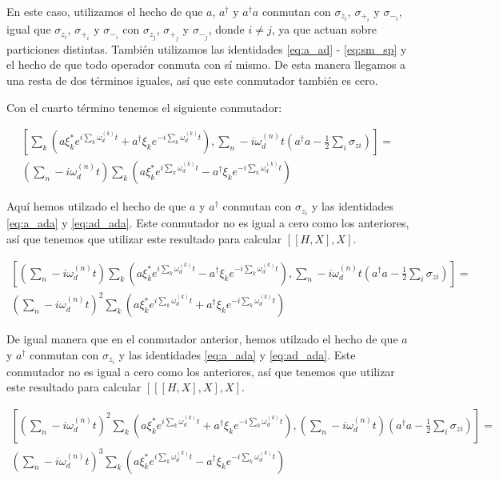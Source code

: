 En este caso, utilizamos el hecho de que $a$, $a^\dagger$ y $a^\dagger a$ conmutan con $\sigma_{z_i}$, $\sigma_{+_i}$ y $\sigma_{-_i}$, igual que $\sigma_{z_i}$, $\sigma_{+_i}$ y $\sigma_{-_i}$ con $\sigma_{z_j}$, $\sigma_{+_j}$ y $\sigma_{-_j}$, donde $i \neq j$, ya que actuan sobre particiones distintas. También utilizamos las identidades \ref{eq:a_ad} - \ref{eq:sm_sp} y el hecho de que todo operador conmuta con sí mismo. De esta manera llegamos a una resta de dos términos iguales, así que este conmutador también es cero.

Con el cuarto término tenemos el siguiente conmutador:

\begin{multline}
    \left[\sum\limits_k \left(a\xi_k^*e^{i\sum\limits_k \omega_d^{(k)}t}+ a^\dagger\xi_ke^{-i\sum\limits_k \omega_d^{(k)}t}\right), \sum\limits_n-i \omega_d^{(n)} t\left(a^\dagger a - \frac{1}{2} \sum\limits_i \sigma_{z i}\right)\right] = \\
    \left(\sum\limits_n-i \omega_d^{(n)} t\right) \sum\limits_k \left(a\xi_k^*e^{i\sum\limits_k \omega_d^{(k)}t} - a^\dagger\xi_ke^{-i\sum\limits_k \omega_d^{(k)}t}\right)
\end{multline}

Aquí hemos utilzado el hecho de que $a$ y $a^\dagger$ conmutan con $\sigma_{z_i}$ y las identidades \ref{eq:a_ada} y \ref{eq:ad_ada}. Este conmutador no es igual a cero como los anteriores, así que tenemos que utilizar este resultado para calcular $[[H,X],X]$.

\begin{multline}
    \left[\left(\sum\limits_n-i \omega_d^{(n)} t\right) \sum\limits_k \left(a\xi_k^*e^{i\sum\limits_k \omega_d^{(k)}t} - a^\dagger\xi_ke^{-i\sum\limits_k \omega_d^{(k)}t}\right), \sum\limits_n-i \omega_d^{(n)} t\left(a^\dagger a - \frac{1}{2} \sum\limits_i \sigma_{z i}\right)\right] = \\
    \left(\sum\limits_n-i \omega_d^{(n)} t\right)^2 \sum\limits_k \left(a\xi_k^*e^{i\sum\limits_k \omega_d^{(k)}t} + a^\dagger\xi_ke^{-i\sum\limits_k \omega_d^{(k)}t}\right)
\end{multline}
 
De igual manera que en el conmutador anterior, hemos utilzado el hecho de que $a$ y $a^\dagger$ conmutan con $\sigma_{z_i}$ y las identidades \ref{eq:a_ada} y \ref{eq:ad_ada}. Este conmutador no es igual a cero como los anteriores, así que tenemos que utilizar este resultado para calcular $[[[H,X],X],X]$.

\begin{multline}
    \left[\left(\sum\limits_n-i \omega_d^{(n)} t\right)^2 \sum\limits_k \left(a\xi_k^*e^{i\sum\limits_k \omega_d^{(k)}t}+ a^\dagger\xi_ke^{-i\sum\limits_k \omega_d^{(k)}t}\right), \left(\sum\limits_n-i \omega_d^{(n)} t\right)\left(a^\dagger a - \frac{1}{2} \sum\limits_i \sigma_{z i}\right)\right] = \\
    \left(\sum\limits_n-i \omega_d^{(n)} t\right)^3 \sum\limits_k \left(a\xi_k^*e^{i\sum\limits_k \omega_d^{(k)}t} - a^\dagger\xi_ke^{-i\sum\limits_k \omega_d^{(k)}t}\right)
\end{multline}

